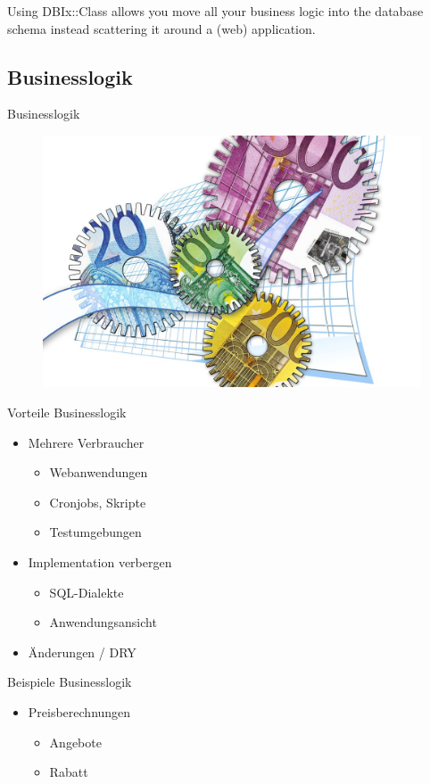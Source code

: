 Using DBIx::Class allows you move all your business logic
into the database schema instead scattering it around a (web)
application.

\subsection{Businesslogik}
\begin{frame}{Businesslogik}
\begin{figure}[!ht]
\centering
\includegraphics[width=0.75\linewidth]{img/business-logic.jpg}
\end{figure}
\end{frame}

\begin{frame}{Vorteile Businesslogik}
\begin{itemize}
\item Mehrere Verbraucher
\begin{itemize}
\item Webanwendungen
\item Cronjobs, Skripte
\item Testumgebungen
\end{itemize}
\item Implementation verbergen
\begin{itemize}
\item SQL-Dialekte
\item Anwendungsansicht
\end{itemize}
\item Änderungen / DRY
\end{itemize}
\end{frame}

\begin{frame}{Beispiele Businesslogik}
\begin{itemize}
\item Preisberechnungen
\begin{itemize}
\item Angebote
\item Rabatt
\end{itemize}
\end{itemize}
\end{frame}

